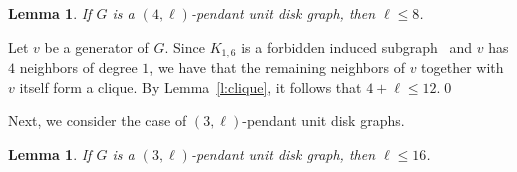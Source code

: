 \documentclass[preprint,12pt]{elsarticle}
\newtheorem{lem}[thm]{Lemma}
\begin{document}
\begin{lem} \label{l:4l-pendant}
If $G$ is a $(4,\ell)$-pendant unit disk graph, then $\ell \leq 8$.
\end{lem}
\begin{pf}
Let $v$ be a generator of $G$. Since $K_{1,6}$ is a forbidden induced subgraph~\cite{heuristics} and $v$ has $4$ neighbors of degree $1$, we have that the remaining neighbors of $v$ together with $v$ itself form a clique. By Lemma~\ref{l:clique}, it follows that $4 + \ell \leq 12$.\qed
\end{pf}

Next, we consider the case of $(3,\ell)$-pendant unit disk graphs.

\begin{lem} \label{l:3l-pendant}
If $G$ is a $(3,\ell)$-pendant unit disk graph, then $\ell \leq 16$.
\end{lem}
\end{document}
